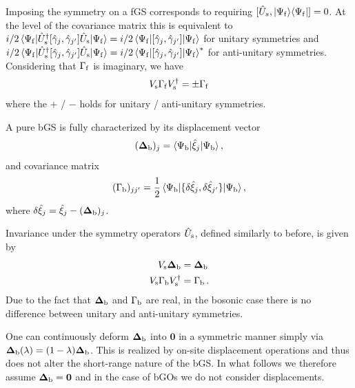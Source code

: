 \documentclass[prl,twocolumn,preprintnumbers,superscriptaddress,amsmath,amssymb]{revtex4-1}
\begin{document}
Imposing the symmetry on a fGS corresponds to requiring $[\hat U_s, |\Psi_{\rm f}\rangle\langle\Psi_{\rm f}|]=0$. At the level of the covariance matrix this is equivalent to $i/2 \braket{\Psi_{\rm f}|\hat U^\dag_{\rm s} [\hat\gamma_j,\hat\gamma_{j'}] \hat U_{\rm s}|\Psi_{\rm f}} =i/2 \braket{\Psi_{\rm f}| [\hat\gamma_j,\hat\gamma_{j'}] |\Psi_{\rm f}}$ for unitary symmetries and  $i/2 \braket{\Psi_{\rm f}|\hat U^\dag_{\rm s} [\hat\gamma_j,\hat\gamma_{j'}] \hat U_{\rm s}|\Psi_{\rm f}}=i/2 \braket{\Psi_{\rm f}| [\hat\gamma_j,\hat\gamma_{j'}] |\Psi_{\rm f}}^*$ for anti-unitary symmetries. Considering that $\Gamma_{\rm f}$ is imaginary, we have
\begin{equation}
V_{\rm s}\Gamma_{\rm f} V_{\rm s}^\dag = \pm \Gamma_{\rm f}
\end{equation}
where the $+$ / $-$ holds for unitary / anti-unitary symmetries.

A pure bGS is fully characterized by its displacement vector
\begin{equation}
(\boldsymbol{\Delta}_{\rm b})_{j} = \braket{\Psi_{\rm b}| \hat\xi_j |\Psi_{\rm b}} ,
\end{equation}
and covariance matrix
\begin{equation}
(\Gamma_{\rm b})_{jj'} = \frac{1}{2} \braket{\Psi_{\rm b}| \{\delta\hat\xi_j,\delta\hat\xi_{j'}\} |\Psi_{\rm b}} ,
\end{equation}
where $\delta\hat\xi_j=\hat\xi_j-(\boldsymbol{\Delta}_{\rm b})_{j}$.

Invariance under the symmetry operators $\hat U_{\rm s}$, defined similarly to before, is given by
\begin{align}
    V_{\rm s} \boldsymbol{\Delta}_{\rm b} &= \boldsymbol{\Delta}_{\rm b} \\
    V_{\rm s}\Gamma_{\rm b} V_{\rm s}^\dag &= \Gamma_{\rm b} \,.
\end{align}
Due to the fact that $\boldsymbol{\Delta}_{\rm b}$ and $\Gamma_{\rm b}$ are real, in the bosonic case there is no difference between unitary and anti-unitary symmetries. 

One can continuously deform $\boldsymbol{\Delta}_{\rm b}$ into $\boldsymbol{0}$ in a symmetric manner simply via $\boldsymbol{\Delta}_{\rm b}(\lambda)=(1-\lambda)\boldsymbol{\Delta}_{\rm b}$. This is realized by on-site displacement operations and thus does not alter the short-range nature of the bGS. In what follows we therefore assume $\boldsymbol{\Delta}_{\rm b}=\boldsymbol{0}$ and in the case of bGOs we do not consider displacements.
\end{document}
